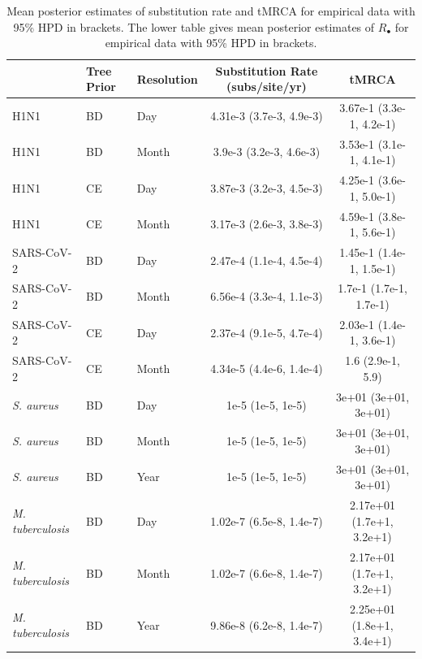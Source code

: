 \documentclass[12pt]{article}
\begin{document}
\begin{table}[H]
    \centering
    \small
    \caption{Mean posterior estimates of substitution rate and tMRCA for empirical data with 95\% HPD in brackets.  The lower table gives mean posterior estimates of $R_{\bullet}$ for empirical data with 95\% HPD in brackets.}
    \begin{tabular}{lllcc}
        \toprule
         & Tree Prior & Resolution & Substitution Rate (subs/site/yr) & tMRCA\\
        \midrule
        H1N1 & BD & Day & 4.31e-3 (3.7e-3, 4.9e-3) & 3.67e-1 (3.3e-1, 4.2e-1)\\
        H1N1 & BD & Month & 3.9e-3 (3.2e-3, 4.6e-3) & 3.53e-1 (3.1e-1, 4.1e-1)\\
        H1N1 & CE & Day & 3.87e-3 (3.2e-3, 4.5e-3) & 4.25e-1 (3.6e-1, 5.0e-1)\\
        H1N1 & CE & Month & 3.17e-3 (2.6e-3, 3.8e-3) & 4.59e-1 (3.8e-1, 5.6e-1)\\
        \midrule
        SARS-CoV-2 & BD & Day & 2.47e-4 (1.1e-4, 4.5e-4) & 1.45e-1 (1.4e-1, 1.5e-1)\\
        SARS-CoV-2 & BD & Month & 6.56e-4 (3.3e-4, 1.1e-3) & 1.7e-1 (1.7e-1, 1.7e-1)\\
        SARS-CoV-2 & CE & Day & 2.37e-4 (9.1e-5, 4.7e-4) & 2.03e-1 (1.4e-1, 3.6e-1)\\
        SARS-CoV-2 & CE & Month & 4.34e-5 (4.4e-6, 1.4e-4) & 1.6 (2.9e-1, 5.9)\\
        \midrule
        \textit{S. aureus} & BD & Day & 1e-5 (1e-5, 1e-5) & 3e+01 (3e+01, 3e+01)\\
        \textit{S. aureus} & BD & Month & 1e-5 (1e-5, 1e-5) & 3e+01 (3e+01, 3e+01)\\
        \textit{S. aureus} & BD & Year & 1e-5 (1e-5, 1e-5) & 3e+01 (3e+01, 3e+01)\\
        \midrule
        \textit{M. tuberculosis} & BD & Day & 1.02e-7 (6.5e-8, 1.4e-7) & 2.17e+01 (1.7e+1, 3.2e+1)\\
        \textit{M. tuberculosis} & BD & Month & 1.02e-7 (6.6e-8, 1.4e-7) & 2.17e+01 (1.7e+1, 3.2e+1)\\
        \textit{M. tuberculosis} & BD & Year & 9.86e-8 (6.2e-8, 1.4e-7) & 2.25e+01 (1.8e+1, 3.4e+1)\\
\bottomrule
    \end{tabular}

    \label{tab:emp-ests}
\end{table}
\end{document}
